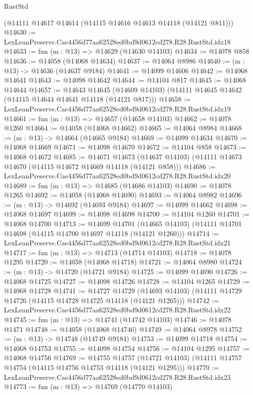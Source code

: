 \begin{lexlean}{RustStd}
\begin{coremodule}
    (@14111 @14617 @14614 (@14115 @14616 @14613 @14118 (@14121 @811)))
@14630 := LexLeanPreserve.Cae4456d77aa62528ed0bd9d0612cd278.R28.RustStd.idx18
@14633 := fun (m : @13) => @14629 (@14630 @14103)
@14634 := @14078 @858
@14636 := @14058 (@14068 @14634)
@14637 := @14064 @8986
@14640 := (m : @13) -> @14636 (@14637 @9184)
@14641 := @14099 @14606
@14642 := @14068 @14641
@14643 := @14098 @14642
@14644 := @14104 @817
@14645 := @14068 @14644
@14657 := @14643
    @14645
    (@14609 @14103)
    (@14111 @14645 @14642 (@14115 @14644 @14641 @14118 (@14121 @817)))
@14658 := LexLeanPreserve.Cae4456d77aa62528ed0bd9d0612cd278.R28.RustStd.idx19
@14661 := fun (m : @13) => @14657 (@14658 @14103)
@14662 := @14078 @1260
@14664 := @14058 (@14068 @14662)
@14665 := @14064 @8984
@14668 := (m : @13) -> @14664 (@14665 @9184)
@14669 := @14099 @14634
@14670 := @14068 @14669
@14671 := @14098 @14670
@14672 := @14104 @858
@14673 := @14068 @14672
@14685 := @14671
    @14673
    (@14637 @14103)
    (@14111 @14673 @14670 (@14115 @14672 @14669 @14118 (@14121 @858)))
@14686 := LexLeanPreserve.Cae4456d77aa62528ed0bd9d0612cd278.R28.RustStd.idx20
@14689 := fun (m : @13) => @14685 (@14686 @14103)
@14690 := @14078 @1265
@14692 := @14058 (@14068 @14690)
@14693 := @14064 @8982
@14696 := (m : @13) -> @14692 (@14693 @9184)
@14697 := @14099 @14662
@14698 := @14068 @14697
@14699 := @14098 @14698
@14700 := @14104 @1260
@14701 := @14068 @14700
@14713 := @14699
    @14701
    (@14665 @14103)
    (@14111 @14701 @14698 (@14115 @14700 @14697 @14118 (@14121 @1260)))
@14714 := LexLeanPreserve.Cae4456d77aa62528ed0bd9d0612cd278.R28.RustStd.idx21
@14717 := fun (m : @13) => @14713 (@14714 @14103)
@14718 := @14078 @1295
@14720 := @14058 (@14068 @14718)
@14721 := @14064 @8980
@14724 := (m : @13) -> @14720 (@14721 @9184)
@14725 := @14099 @14690
@14726 := @14068 @14725
@14727 := @14098 @14726
@14728 := @14104 @1265
@14729 := @14068 @14728
@14741 := @14727
    @14729
    (@14693 @14103)
    (@14111 @14729 @14726 (@14115 @14728 @14725 @14118 (@14121 @1265)))
@14742 := LexLeanPreserve.Cae4456d77aa62528ed0bd9d0612cd278.R28.RustStd.idx22
@14745 := fun (m : @13) => @14741 (@14742 @14103)
@14746 := @14078 @1471
@14748 := @14058 (@14068 @14746)
@14749 := @14064 @8978
@14752 := (m : @13) -> @14748 (@14749 @9184)
@14753 := @14099 @14718
@14754 := @14068 @14753
@14755 := @14098 @14754
@14756 := @14104 @1295
@14757 := @14068 @14756
@14769 := @14755
    @14757
    (@14721 @14103)
    (@14111 @14757 @14754 (@14115 @14756 @14753 @14118 (@14121 @1295)))
@14770 := LexLeanPreserve.Cae4456d77aa62528ed0bd9d0612cd278.R28.RustStd.idx23
@14773 := fun (m : @13) => @14769 (@14770 @14103)

\end{coremodule}
\end{lexlean}
